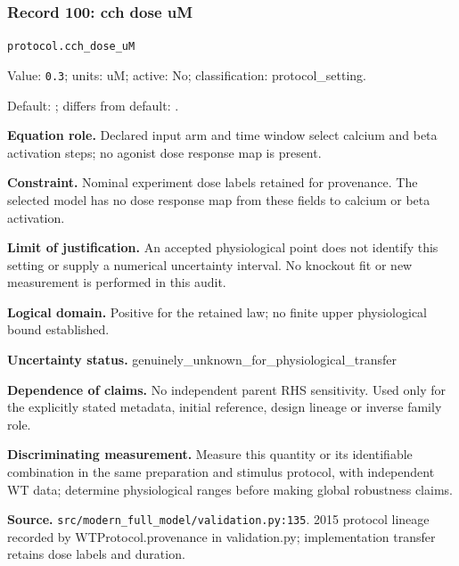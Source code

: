 \subsubsection*{Record 100: cch dose uM}
{\small \nolinkurl{protocol.cch_dose_uM}\par

Value: \texttt{0.3}; units: uM; active: No; classification: protocol\_setting.\par

Default: ; differs from default: .\par

\textbf{Equation role.} Declared input arm and time window select calcium and beta activation steps; no agonist dose response map is present.\par

\textbf{Constraint.} Nominal experiment dose labels retained for provenance. The selected model has no dose response map from these fields to calcium or beta activation.\par

\textbf{Limit of justification.} An accepted physiological point does not identify this setting or supply a numerical uncertainty interval. No knockout fit or new measurement is performed in this audit.\par

\textbf{Logical domain.} Positive for the retained law; no finite upper physiological bound established.\par

\textbf{Uncertainty status.} genuinely\_unknown\_for\_physiological\_transfer\par

\textbf{Dependence of claims.} No independent parent RHS sensitivity. Used only for the explicitly stated metadata, initial reference, design lineage or inverse family role.\par

\textbf{Discriminating measurement.} Measure this quantity or its identifiable combination in the same preparation and stimulus protocol, with independent WT data; determine physiological ranges before making global robustness claims.\par

\textbf{Source.} \nolinkurl{src/modern_full_model/validation.py:135}. 2015 protocol lineage recorded by WTProtocol.provenance in validation.py; implementation transfer retains dose labels and duration.\par}

